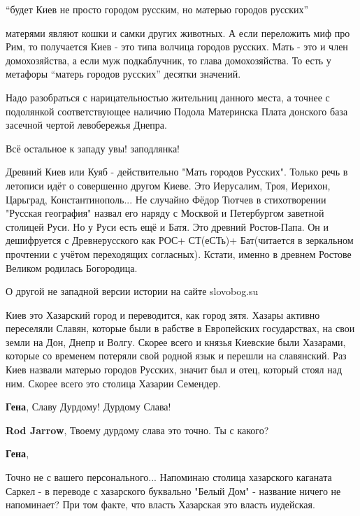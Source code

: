 \begin{itemize}

\enquote{будет Киев не просто городом русским, но матерью городов русских}

матерями являют кошки и самки других животных. А если переложить миф про Рим,
то получается Киев - это типа волчица городов русских. Мать - это и член
домохозяйства, а если муж подкаблучник, то глава домохозяйства. То есть у
метафоры \enquote{матерь городов русских} десятки значений.


Надо разобраться с нарицательностью жительниц данного места, а точнее с
подолянкой соответствующее наличию Подола Материнска Плата донского база
засечной чертой левобережья Днепра.

Всё остальное к западу увы! заподлянка!


Древний Киев или Куяб - действительно "Мать городов Русских". Только речь в
летописи идёт о совершенно другом Киеве. Это Иерусалим, Троя, Иерихон,
Царьград, Константинополь... Не случайно Фёдор Тютчев в стихотворении "Русская
география" назвал его наряду с Москвой и Петербургом заветной столицей Руси. Но
у Руси есть ещё и Батя. Это древний Ростов-Папа. Он и дешифруется с
Древнерусского как РОС+ СТ(еСТь)+ Бат(читается в зеркальном прочтении с учётом
переходящих согласных). Кстати, именно в древнем Ростове Великом родилась
Богородица.

О другой не западной версии истории на сайте slovobog.su


Киев это Хазарский город и переводится, как город зятя. Хазары активно
переселяли Славян, которые были в рабстве в Европейских государствах, на свои
земли на Дон, Днепр и Волгу. Скорее всего и князья Киевские были Хазарами,
которые со временем потеряли свой родной язык и перешли на славянский. Раз Киев
назвали матерью городов Русских, значит был и отец, который стоял над ним.
Скорее всего это столица Хазарии Семендер.

\begin{itemize} %
\textbf{Гена}, Славу Дурдому! Дурдому Слава!

\textbf{Rod Jarrow}, Твоему дурдому слава это точно. Ты с какого?

\textbf{Гена}, 

Точно не с вашего персонального... Напоминаю столица хазарского каганата Саркел
- в переводе с хазарского буквально "Белый Дом" - название ничего не
напоминает? При том факте, что власть Хазарская это власть иудейская.


\end{itemize}
\end{itemize}
